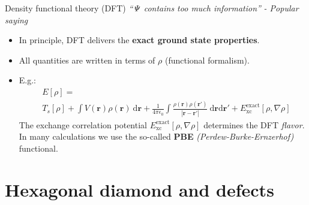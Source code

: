 \documentclass[notes=hide]{beamer}
\begin{document}
\begin{frame}{Density functional theory (DFT)}
  \textit{``$ \it \Psi  $  contains too much information''}
  \hfill \textit{- Popular saying}
  \begin{itemize}
    \item In principle, DFT delivers the \textbf{exact ground state properties}.

    \item All quantities are written in terms of $ \rho $ (functional formalism).
    \item E.g.:
      \begin{align*}
        &E[ \rho ] =\\
        &T_{s} [ \rho  ]
        +
        \int  V ( \mathbf{r} ) \rho ( \mathbf{r} ) \ \mathrm{d} \mathbf{r}
        +
        \frac{1}{4\pi \epsilon _{0}}
        \int
        \frac{\rho ( \mathbf{r} ) \rho ( \mathbf{r}' )}{| \mathbf{r} - \mathbf{r}'|}
        \ \mathrm{d} \mathbf{r}\mathrm{d} \mathbf{r}'
        +
        E^{ \mathrm{exact}}_{ \mathrm{xc}} [ \rho, \nabla \rho  ]
      \end{align*}
      The exchange correlation potential
      $ E^{ \mathrm{exact}}_{ \mathrm{xc}} [ \rho , \nabla \rho  ] $
      determines the DFT \textit{flavor}.
      In many calculations we use the so-called \textbf{PBE} \textit{(Perdew-Burke-Ernzerhof)} functional.
  \end{itemize}
\end{frame}




\section{Hexagonal diamond and defects} %


\end{document}
